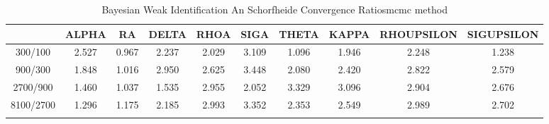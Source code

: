 \documentclass[a4paper,10pt]{article}
\begin{document}
\centering
\begin{longtable}{cccccccccc}
\toprule
 & ALPHA & RA & DELTA & RHOA & SIGA & THETA & KAPPA & RHOUPSILON & SIGUPSILON \\
\midrule
300/100 & 2.527 & 0.967 & 2.237 & 2.029 & 3.109 & 1.096 & 1.946 & 2.248 & 1.238 \\
900/300 & 1.848 & 1.016 & 2.950 & 2.625 & 3.448 & 2.080 & 2.420 & 2.822 & 2.579 \\
2700/900 & 1.460 & 1.037 & 1.535 & 2.955 & 2.052 & 3.329 & 3.096 & 2.904 & 2.676 \\
8100/2700 & 1.296 & 1.175 & 2.185 & 2.993 & 3.352 & 2.353 & 2.549 & 2.989 & 2.702 \\
\bottomrule
\caption{Bayesian Weak Identification An Schorfheide Convergence Ratiosmcmc method}
\label{table:tbl:WeakAnSchoConvergenceRatios_mcmc}
\end{longtable}
\end{document}
